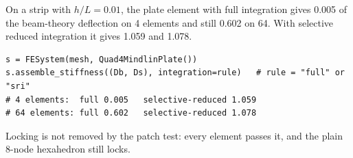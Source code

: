 \newpage\thispagestyle{hl}
\par
{}
\begin{hlheadline}On a strip with $h/L=0.01$, the plate element with full integration gives 0.005 of the beam-theory deflection on 4 elements and still 0.602 on 64. With selective reduced integration it gives 1.059 and 1.078.\end{hlheadline}
\begin{lstlisting}[style=hlpy]
s = FESystem(mesh, Quad4MindlinPlate())
s.assemble_stiffness((Db, Ds), integration=rule)   # rule = "full" or "sri"
# 4 elements:  full 0.005   selective-reduced 1.059
# 64 elements: full 0.602   selective-reduced 1.078
\end{lstlisting}
\begin{hllimit}Locking is not removed by the patch test: every element passes it, and the plain 8-node hexahedron still locks.\end{hllimit}
